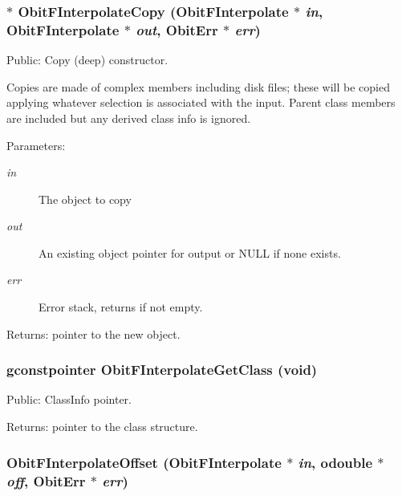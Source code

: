 \subsubsection{$\ast$ Obit\-FInterpolate\-Copy ({\bf Obit\-FInterpolate} $\ast$ {\em in}, {\bf Obit\-FInterpolate} $\ast$ {\em out}, {\bf Obit\-Err} $\ast$ {\em err})}\label{ObitFInterpolate_8h_a7}


Public: Copy (deep) constructor. 

Copies are made of complex members including disk files; these will be copied applying whatever selection is associated with the input. Parent class members are included but any derived class info is ignored. \begin{Desc}
\item[Parameters:]
\begin{description}
\item[{\em in}]The object to copy \item[{\em out}]An existing object pointer for output or NULL if none exists. \item[{\em err}]Error stack, returns if not empty. \end{description}
\end{Desc}
\begin{Desc}
\item[Returns:]pointer to the new object. \end{Desc}
\subsubsection{\setlength{\rightskip}{0pt plus 5cm}gconstpointer Obit\-FInterpolate\-Get\-Class (void)}\label{ObitFInterpolate_8h_a6}


Public: Class\-Info pointer. 

\begin{Desc}
\item[Returns:]pointer to the class structure. \end{Desc}
\subsubsection{ Obit\-FInterpolate\-Offset ({\bf Obit\-FInterpolate} $\ast$ {\em in}, {\bf odouble} $\ast$ {\em off}, {\bf Obit\-Err} $\ast$ {\em err})}\label{ObitFInterpolate_8h_a13}


